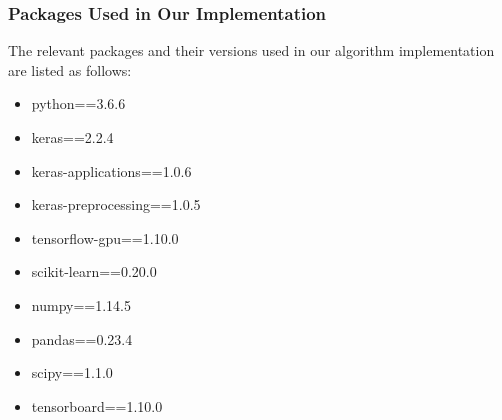 \documentclass[sigconf]{acmart}
\begin{document}
\subsubsection{Packages Used in Our Implementation}
The relevant packages and their versions used in our algorithm implementation are listed as follows:
\begin{itemize}
    \item python==3.6.6
    \item keras==2.2.4
    \item keras-applications==1.0.6
    \item keras-preprocessing==1.0.5
    \item tensorflow-gpu==1.10.0
    \item scikit-learn==0.20.0
    \item numpy==1.14.5
    \item pandas==0.23.4
    \item scipy==1.1.0
    \item tensorboard==1.10.0
\end{itemize}
\end{document}
